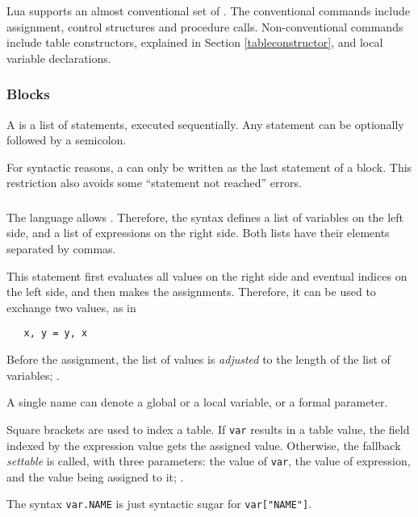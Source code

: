 Lua supports an almost conventional set of .
The conventional commands include
assignment, control structures and procedure calls.
Non-conventional commands include table constructors,
explained in Section \ref{tableconstructor},
and local variable declarations.

\subsubsection{Blocks}
A  is a list of statements, executed sequentially.
Any statement can be optionally followed by a semicolon.
\begin{Produc}
\end{Produc}%
For syntactic reasons, a  can only be written
as the last statement of a block.
This restriction also avoids some ``statement not reached'' errors.

\subsubsection{} \label{assignment}
The language allows .
Therefore, the syntax defines a list of variables on the left side,
and a list of expressions on the right side.
Both lists have their elements separated by commas.
\begin{Produc}
\end{Produc}%
This statement first evaluates all values on the right side
and eventual indices on the left side,
and then makes the assignments.
Therefore, it can be used to exchange two values, as in
\begin{verbatim}
   x, y = y, x
\end{verbatim}
Before the assignment, the list of values is {\em adjusted} to
the length of the list of variables; .

\begin{Produc}
\end{Produc}%
A single name can denote a global or a local variable,
or a formal parameter.
\begin{Produc}
\end{Produc}%
Square brackets are used to index a table.
If \verb'var' results in a table value,
the field indexed by the expression value gets the assigned value.
Otherwise, the fallback {\em settable} is called,
with three parameters: the value of \verb'var',
the value of expression, and the value being assigned to it;
.
\begin{Produc}
\end{Produc}%
The syntax \verb'var.NAME' is just syntactic sugar for
\verb'var["NAME"]'.

